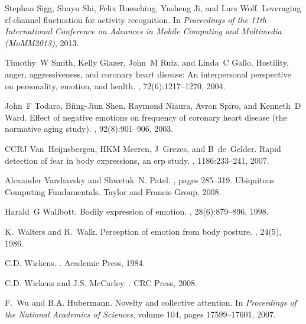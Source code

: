 \documentclass[12pt]{article}
\begin{document}
\begin{thebibliography}{10}
Stephan Sigg, Shuyu Shi, Felix Buesching, Yusheng Ji, and Lars Wolf.
\newblock Leveraging rf-channel fluctuation for activity recognition.
\newblock In {\em Proceedings of the 11th International Conference on Advances
  in Mobile Computing and Multimedia (MoMM2013)}, 2013.

Timothy~W Smith, Kelly Glazer, John~M Ruiz, and Linda~C Gallo.
\newblock Hostility, anger, aggressiveness, and coronary heart disease: An
  interpersonal perspective on personality, emotion, and health.
, 72(6):1217--1270, 2004.

John~F Todaro, Biing-Jiun Shen, Raymond Niaura, Avron Spiro, and Kenneth~D
  Ward.
\newblock Effect of negative emotions on frequency of coronary heart disease
  (the normative aging study).
, 92(8):901--906, 2003.

CCRJ Van~Heijnsbergen, HKM Meeren, J~Grezes, and B~de~Gelder.
\newblock Rapid detection of fear in body expressions, an erp study.
, 1186:233--241, 2007.

Alexander Varshavsky and Shwetak~N. Patel.
, pages 285--319.
\newblock Ubiquitous Computing Fundamentals. Taylor and Francis Group, 2008.

Harald~G Wallbott.
\newblock Bodily expression of emotion.
, 28(6):879--896, 1998.

K.~Walters and R.~Walk.
\newblock Perception of emotion from body posture.
, 24(5), 1986.

C.D. Wickens.
.
\newblock Academic Press, 1984.

C.D. Wickens and J.S. McCarley.
.
\newblock CRC Press, 2008.

F.~Wu and B.A. Hubermann.
\newblock Novelty and collective attention.
\newblock In {\em Proceedings of the National Academics of Sciences}, volume
  104, pages 17599--17601, 2007.


\end{thebibliography}
\end{document}
